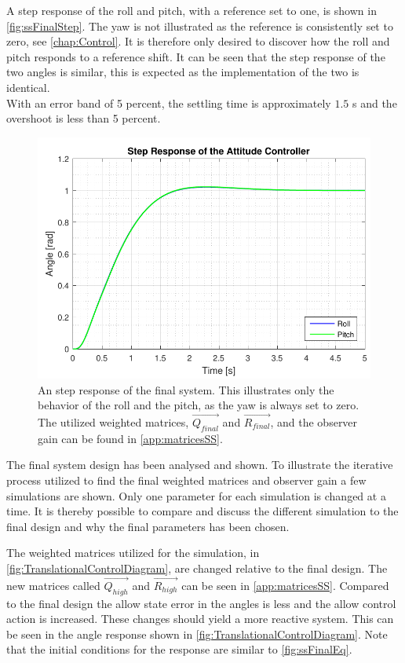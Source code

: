 A step response of the roll and pitch, with a reference set to one, is shown in \autoref{fig:ssFinalStep}. The yaw is not illustrated as the reference is consistently set to zero, see \autoref{chap:Control}. It is therefore only desired to discover how the roll and pitch responds to a reference shift. It can be seen that the step response of the two angles is similar, this is expected as the implementation of the two is identical. \\ With an error band of 5 percent, the settling time is approximately $1.5$ \si{s} and the overshoot is less than 5 percent. 

\begin{figure}[H]
	\centering
	\includegraphics[scale=0.8]{figures/ssFinalStep.pdf}
	\caption{An step response of the final system. This illustrates only the behavior of the roll and the pitch, as the yaw is always set to zero. The utilized weighted matrices, $\vec{Q_{final}}$ and $\vec{R_{final}}$, and the observer gain can be found in \autoref{app:matricesSS}.}
	\label{fig:ssFinalStep}
\end{figure}

The final system design has been analysed and shown. To illustrate the iterative process utilized to find the final weighted matrices and observer gain a few simulations are shown. Only one parameter for each simulation is changed at a time. It is thereby possible to compare and discuss the different simulation to the final design and why the final parameters has been chosen.

The weighted matrices utilized for the simulation, in \autoref{fig:TranslationalControlDiagram}, are changed relative to the final design. The new matrices called $\vec{Q_{high}}$ and $\vec{R_{high}}$ can be seen in \autoref{app:matricesSS}. Compared to the final design the allow state error in the angles is less and the allow control action is increased. These changes should yield a more reactive system. This can be seen in the angle response shown in \autoref{fig:TranslationalControlDiagram}. Note that the initial conditions for the response are similar to \autoref{fig:ssFinalEq}.

